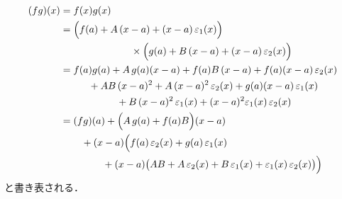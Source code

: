 \begin{align*}
(fg)(x) &= f(x) g(x) \\
& =\Bigl(  f(a) + A \, (x-a) + (x-a) \, \varepsilon_1(x) \Bigr) \\
& \hspace{2.5cm} \times \Bigl( g(a) + B \, (x-a) + (x-a) \, \varepsilon_2(x) \Bigr) \\
& = f(a) g(a) + A \, g(a) (x-a) + f(a) B \, (x-a) 
+ f(a) (x-a) \, \varepsilon_2(x) \\ 
& \hspace{1cm} + AB \, (x-a)^2 + A \, (x-a)^2 \, \varepsilon_2(x) 
+ g(a) (x-a) \, \varepsilon_1(x) \\ 
& \hspace{2cm} + B \, (x-a) ^2 \, \varepsilon_1(x) 
+ (x-a) ^2 \varepsilon_1(x) \, \varepsilon_2(x) \\
& = (fg)(a) + \Bigl( A \, g(a) + f(a) B \Bigr) (x-a) \\
& \hspace{0.75cm} + (x-a) \Bigl( f(a) \, \varepsilon_2(x) + g(a) \, \varepsilon_1(x) \\
& \hspace{1.5cm} + (x-a) \bigl( AB+ A \, \varepsilon_2(x) + B \, \varepsilon_1(x) 
+ \varepsilon_1(x) \, \varepsilon_2(x) \bigr) \Bigr)
\end{align*}
と書き表される．

